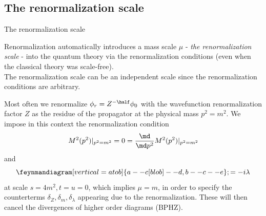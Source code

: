 \subsection{The renormalization scale}
\begin{mybox}{The renormalization scale}
	
	Renormalization automatically introduces a mass scale $\mu$ - \emph{the renormalization scale} - into the quantum theory via the renormalization conditions (even when the classical theory was scale-free).\\
	The renormalization scale can be an independent scale since the renormalization conditions are arbitrary.
\end{mybox}
Most often we renormalize $\phi_r=Z^{-\half} \phi_0$ with the wavefunction renormalization factor $Z$ as the residue of the propagator at the physical mass $p^2=m^2$. We impose in this context the renormalization condition
\begin{equation}
	M^2(p^2) |_{p^2=m^2} = 0 = \frac{\md}{\md p^2} M^2(p^2) |_{p^2=m^2}
\end{equation}
and
\begin{equation}
	\feynmandiagram[vertical=a to b]{a--c[blob]--d, b--c--e}; = -i \lambda 
\end{equation}
at scale $s=4m^2, t=u=0$, which implies $\mu=m$, in order to specify the counterterms $\delta_Z,\delta_m,\delta_{\lambda}$ appearing due to the renormalization. These will then cancel the divergences of higher order diagrams (BPHZ).

